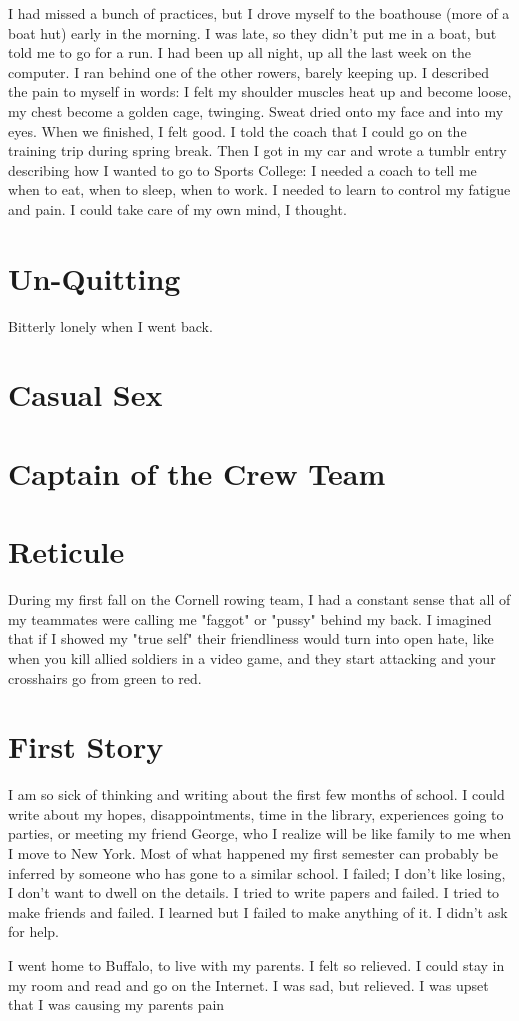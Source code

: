 \documentclass[12pt]{article}
\begin{document}
I had missed a bunch of practices, but I drove myself to the boathouse (more of
a boat hut) early in the morning.  I was late, so they didn't put me in a boat,
but told me to go for a run.  I had been up all night, up all the last week on
the computer.  I ran behind one of the other rowers, barely keeping up.  I
described the pain to myself in words: I felt my shoulder muscles heat up and
become loose, my chest become a golden cage, twinging.  Sweat dried onto my face
and into my eyes.  When we finished, I felt good.  I told the coach that I could
go on the training trip during spring break.  Then I got in my car and wrote a
tumblr entry describing how I wanted to go to Sports College: I needed a coach
to tell me when to eat, when to sleep, when to work.  I needed to learn to
control my fatigue and pain.  I could take care of my own mind, I thought.





\section{Un-Quitting}
Bitterly lonely when I went back.

\section{Casual Sex}

\section{Captain of the Crew Team}

\section{Reticule}
During my first fall on the Cornell rowing team, I had a constant sense that all
of my teammates were calling me "faggot" or "pussy" behind my back.  I imagined
that if I showed my "true self" their friendliness would turn into open hate,
like when you kill allied soldiers in a video game, and they start attacking and
your crosshairs go from green to red.  


\section{First Story}
I am so sick of thinking and writing about the first few months of school.  I
could write about my hopes, disappointments, time in the library, experiences
going to parties, or meeting my friend George, who I realize will be like family
to me when I move to New York.  Most of what happened my first semester can
probably be inferred by someone who has gone to a similar school.  I failed; I
don't like losing, I don't want to dwell on the details.  I tried to write
papers and failed.  I tried to make friends and failed.  I learned but I failed
to make anything of it.  I didn't ask for help.

I went home to Buffalo, to live with my parents.  I felt so relieved.  I could
stay in my room and read and go on the Internet.  I was sad, but relieved.  I
was upset that I was causing my parents pain
\end{document}
